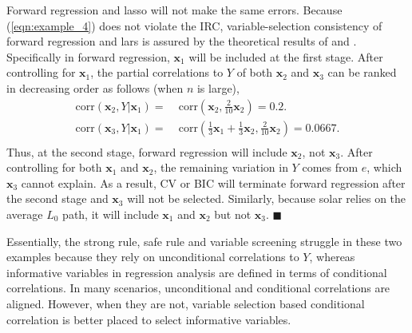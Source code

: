 \documentclass[12pt]{article}
\begin{document}
Forward regression and lasso will not make the same errors. Because (\ref{eqn:example_4}) does not violate the IRC, variable-selection consistency of forward regression and lars is assured by the theoretical results of \citet{zhang09} and \citet{zhaoyu06}. Specifically in forward regression, $\mathbf{x}_1$ will be included  at the first stage. After controlling for $\mathbf{x}_1$, the partial correlations to $Y$ of both $\mathbf{x}_2$ and $\mathbf{x}_3$ can be ranked in decreasing order as follows (when $n$ is large),
%
\begin{equation}
  \begin{aligned}
    \mathrm{corr} \left( \mathbf{x}_2, Y \vert \mathbf{x}_1 \right)  = & \;\mathrm{corr} \left( \mathbf{x}_2, \frac{2}{10} \mathbf{x}_2 \right)
    = 0.2. \\
    \mathrm{corr} \left( \mathbf{x}_3, Y \vert \mathbf{x}_1 \right)  = & \;\mathrm{corr} \left( \frac{1}{3} \mathbf{x}_1 + \frac{1}{3} \mathbf{x}_2, \frac{2}{10} \mathbf{x}_2 \right)
    = 0.0667. \\
  \end{aligned}
\end{equation}
%
Thus, at the second stage, forward regression will include $\mathbf{x}_2$, not $\mathbf{x}_3$. After controlling for both $\mathbf{x}_1$ and $\mathbf{x}_2$, the remaining variation in $Y$ comes from $e$, which $\mathbf{x}_3$ cannot explain. As a result, CV or BIC will terminate forward regression after the second stage and $\mathbf{x}_3$ will not be selected. Similarly, because solar relies on the average $L_0$ path, it will include $\mathbf{x}_1$ and $\mathbf{x}_2$ but not $\mathbf{x}_3$. $\blacksquare$

\smallskip
Essentially, the strong rule, safe rule and variable screening struggle in these two examples because they rely on unconditional correlations to $Y$, whereas informative variables in regression analysis are defined in terms of conditional correlations. In many scenarios, unconditional and conditional correlations are aligned. However, when they are not, variable selection based conditional correlation is better placed to select informative variables. 
\end{document}
